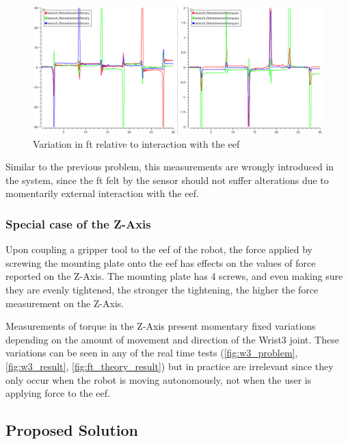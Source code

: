 \begin{figure}[h]
    \centering
    \includegraphics[width=0.9\linewidth]{figs/chp3/ft_sensor_pushes.png}
    \caption{Variation in \ac{ft} relative to interaction with the \ac{eef}}
    \label{fig:ft_sensor_pushes}
\end{figure}

\par Similar to the previous problem, this measurements are wrongly introduced in the system, since the \ac{ft} felt by the sensor should not suffer alterations due to momentarily external interaction with the \ac{eef}.

\subsubsection{Special case of the Z-Axis}

\par Upon coupling a gripper tool to the \ac{eef} of the robot, the force applied by screwing the mounting plate onto the \ac{eef} has effects on the values of force reported on the Z-Axis. The mounting plate has 4 screws, and even making sure they are evenly tightened, the stronger the tightening, the higher the force measurement on the Z-Axis.

\par Measurements of torque in the Z-Axis present momentary fixed variations depending on the amount of movement and direction of the Wrist3 joint. These variations can be seen in any of the real time tests (\autoref{fig:w3_problem}, \autoref{fig:w3_result}, \autoref{fig:ft_theory_result}) but in practice are irrelevant since they only occur when the robot is moving autonomously, not when the user is applying force to the \ac{eef}.

\subsection{Proposed Solution}
\label{ssec:w3_solution}

